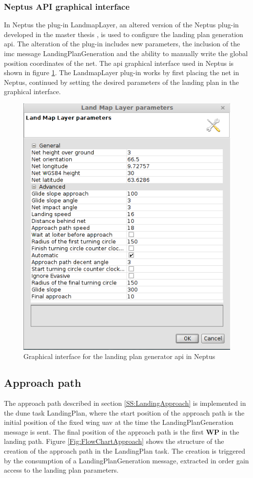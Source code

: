\subsubsection{Neptus API graphical interface}
In Neptus the plug-in LandmapLayer, an altered version of the Neptus plug-in developed in the master thesis \citep{Froelich}, is used to configure the landing plan generation \gls{api}. The alteration of the plug-in includes new parameters, the inclusion of the \gls{imc} message LandingPlanGeneration and the ability to manually write the global position coordinates of the net. The \gls{api} graphical interface used in Neptus is shown in figure \ref{Fig:LandMapLayer}. The LandmapLayer plug-in works by first placing the net in Neptus, continued by setting the desired parameters of the landing plan in the graphical interface.
\newpage
\begin{figure}[H]
\centering
\includegraphics[scale=0.6]{figs/LandMapLayer.png}
\caption{Graphical interface for the landing plan  generator \gls{api} in Neptus}
\label{Fig:LandMapLayer}
\end{figure}
\subsection{Approach path}
The approach path described in section \ref{SS:LandingApproach} is implemented in the \gls{dune} task LandingPlan, where the start position of the approach path is the initial position of the fixed wing \gls{uav} at the time the LandingPlanGeneration message is sent. The final position of the approach path is the first $\textbf{WP}$ in the landing path. Figure \ref{Fig:FlowChartApproach} shows the structure of the creation of the approach path in the LandingPlan task. The creation is triggered by the consumption of a LandingPlanGeneration message, extracted in order gain access to the landing plan parameters. 

